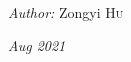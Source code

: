 \begin{titlepage}
\makeatletter
{\huge \bfseries \@title}\\[0.4cm] %
\vspace{+12em}
\begin{minipage}{0.4\textwidth}
\centerline{{\large \emph{Author:} Zongyi \textsc{Hu}}\\[1cm]}
\centerline{{\large \emph{    Aug 2021} }\\}
\vspace{+12em}
\end{minipage}




\end{titlepage}
